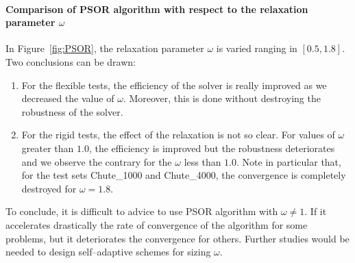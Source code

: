\paragraph{Comparison of {\sf PSOR}  algorithm with respect to  the relaxation parameter $\omega$}

In Figure~\ref{fig:PSOR},  the relaxation parameter $\omega$ is varied ranging in $[0.5,1.8]$.  Two conclusions can be drawn:
\begin{enumerate}
\item For the flexible tests, the efficiency of the solver is really improved as we decreased the value of $\omega$. Moreover, this is done without destroying the robustness of the solver.
\item For the rigid tests, the effect of the relaxation is not so clear. For values of $\omega$ greater than $1.0$, the efficiency is improved but the robustness deteriorates and we observe the contrary for the  $\omega$  less than $1.0$. Note in particular that, for the test sets Chute\_1000 and Chute\_4000, the convergence is completely destroyed for $\omega = 1.8$.
\end{enumerate}
To conclude, it is difficult to advice to use PSOR algorithm with $\omega\neq 1$. If it accelerates drastically the rate of convergence of the algorithm for some problems, but it deteriorates the convergence for others. Further studies would be needed to design self--adaptive schemes for sizing $\omega$.

